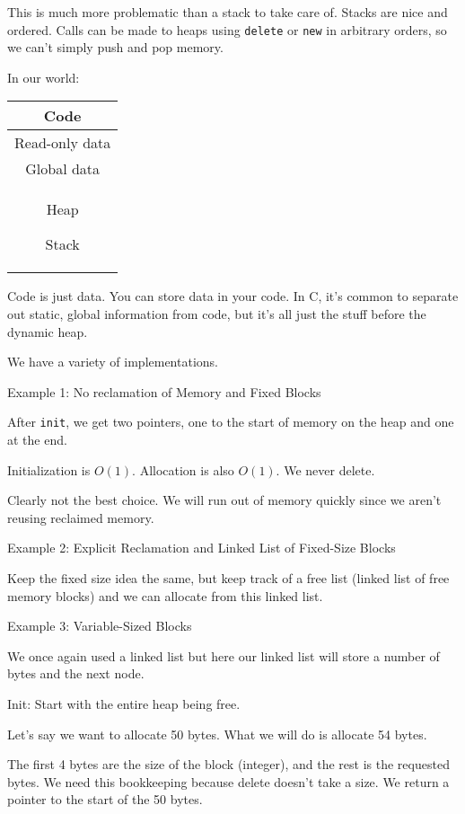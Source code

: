 \documentclass{article}
\begin{document}
This is much more problematic than a stack to take care of. Stacks are
nice and ordered. Calls can be made to heaps using \texttt{delete} or
\texttt{new} in arbitrary orders, so we can't simply push and pop
memory.

In our world:


\begin{table}[h]
    \centering
    \begin{tabular}{|c|}\hline
        Code\\\hline
        Read-only data\\\hline
        Global data\\\hline
        Heap

Stack\\\hline
    \end{tabular}
    
\end{table}

Code is just data. You can store data in your code. In C, it's common to
separate out static, global information from code, but it's all just the
stuff before the dynamic heap.


We have a variety of implementations.

Example 1: No reclamation of Memory and Fixed Blocks

After \texttt{init}, we get two pointers, one to the start of memory on
the heap and one at the end.

Initialization is \(O(1)\). Allocation is also \(O(1)\). We never
delete.

Clearly not the best choice. We will run out of memory quickly since we
aren't reusing reclaimed memory.

Example 2: Explicit Reclamation and Linked List of Fixed-Size Blocks

Keep the fixed size idea the same, but keep track of a free list (linked
list of free memory blocks) and we can allocate from this linked list.

Example 3: Variable-Sized Blocks

We once again used a linked list but here our linked list will store a
number of bytes and the next node.

Init: Start with the entire heap being free.

Let's say we want to allocate 50 bytes. What we will do is allocate 54
bytes.

The first 4 bytes are the size of the block (integer), and the rest is
the requested bytes. We need this bookkeeping because delete doesn't
take a size. We return a pointer to the start of the 50 bytes.
\end{document}
